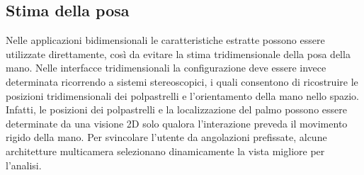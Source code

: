 \subsection{Stima della posa}

Nelle applicazioni bidimensionali le caratteristiche estratte possono essere utilizzate direttamente, così da evitare la stima tridimensionale della posa della mano.
Nelle interfacce tridimensionali la configurazione deve essere invece determinata ricorrendo a sistemi stereoscopici, i quali consentono di ricostruire le posizioni tridimensionali dei polpastrelli e l'orientamento della mano nello spazio.
Infatti, le posizioni dei polpastrelli e la localizzazione del palmo possono essere determinate da una visione 2D solo qualora l'interazione preveda il movimento rigido della mano. 
Per svincolare l'utente da angolazioni prefissate, alcune architetture multicamera selezionano dinamicamente la vista migliore per l'analisi.